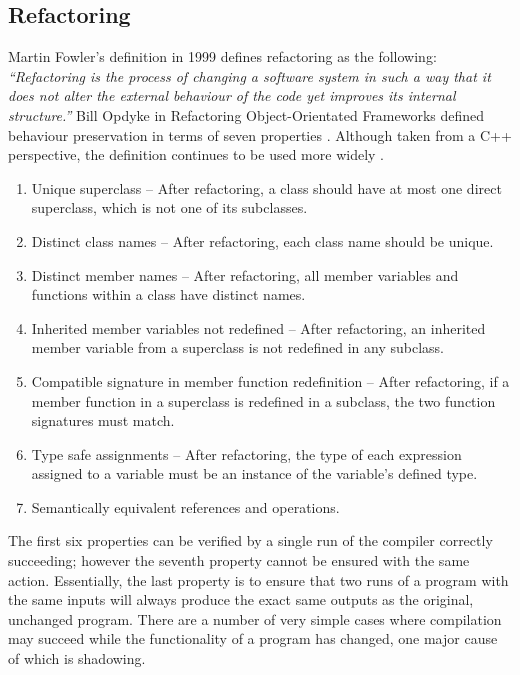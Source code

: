 \subsection{Refactoring}

Martin Fowler's definition in 1999 \cite{fowler99} defines refactoring as the following: \emph{``Refactoring is the process of changing a software system in such a way that it does not alter the external behaviour of the code yet improves its internal structure.''} Bill Opdyke in Refactoring Object-Orientated Frameworks defined behaviour preservation in terms of seven properties \cite{opdyke1992refactoring}. Although taken from a C++ perspective, the definition continues to be used more widely \cite{schafer2010specification}.

\begin{enumerate}
\item Unique superclass -- After refactoring, a class should have at most one direct superclass, which is not one of its subclasses.
\item Distinct class names -- After refactoring, each class name should be unique.
\item Distinct member names --  After refactoring, all member variables and functions within a class have distinct names.
\item Inherited member variables not redefined -- After refactoring, an inherited member variable from a superclass is not redefined in any subclass.
\item Compatible signature in member function redefinition -- After refactoring, if a member function in a superclass is redefined in a subclass, the two function signatures must match.
\item Type safe assignments -- After refactoring, the type of each expression assigned to a variable must be an instance of the variable's defined type.
\item Semantically equivalent references and operations.
\end{enumerate}

The first six properties can be verified by a single run of the compiler correctly succeeding; however the seventh property cannot be ensured with the same action. Essentially, the last property is to ensure that two runs of a program with the same inputs will always produce the exact same outputs as the original, unchanged program. There are a number of very simple cases where compilation may succeed while the functionality of a program has changed, one major cause of which is shadowing. 

